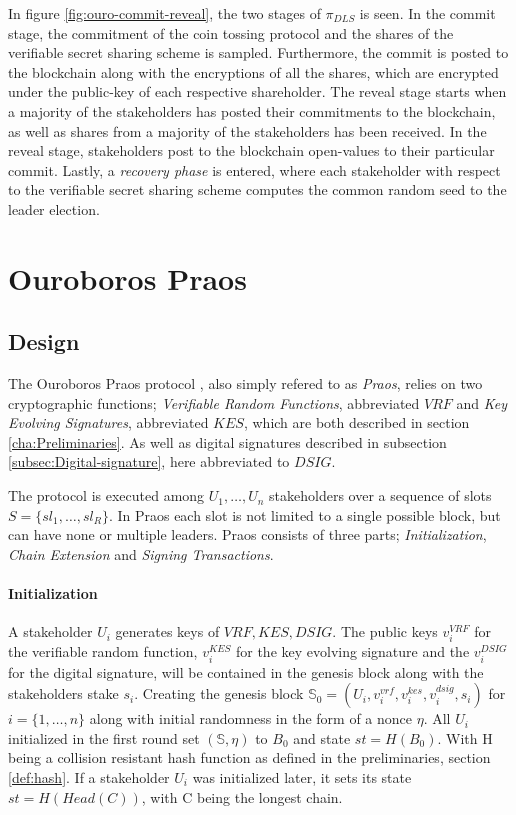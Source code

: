 In figure \ref{fig:ouro-commit-reveal}, the two stages of $\pi_{DLS}$ is seen. In the commit stage, the commitment of the coin tossing protocol and the shares of the verifiable secret sharing scheme is sampled. Furthermore, the commit is posted to the blockchain along with the encryptions of all the shares, which are encrypted under the public-key of each respective shareholder. The reveal stage starts when a majority of the stakeholders has posted their commitments to the blockchain, as well as shares from a majority of the stakeholders has been received. In the reveal stage, stakeholders post to the blockchain open-values to their particular commit. Lastly, a \emph{recovery phase} is entered, where each stakeholder with respect to the verifiable secret sharing scheme computes the common random seed to the leader election. 


\section{Ouroboros Praos}

\subsection{Design}

The Ouroboros Praos protocol \cite{ouroboros-praos}, also simply refered to as \emph{Praos}, relies on two cryptographic functions; \emph{Verifiable Random Functions}, abbreviated $VRF$ and \emph{Key Evolving Signatures}, abbreviated $KES$, which are both described in section \ref{cha:Preliminaries}. As well as digital signatures described in subsection \ref{subsec:Digital-signature}, here abbreviated to $DSIG$. 

The protocol is executed among $U_1,\dots, U_n$ stakeholders over a sequence of slots $S = \{sl_1, \dots, sl_R\}$. In Praos each slot is not limited to a single possible block, but can have none or multiple leaders. Praos consists of three parts; \emph{Initialization}, \emph{Chain Extension} and \emph{Signing Transactions}.

\paragraph{Initialization} A stakeholder $U_i$ generates keys of $VRF, KES, DSIG$. The public keys $v^{VRF}_i$ for the verifiable random function, $v^{KES}_i$ for the key evolving signature and the $v^{DSIG}_i$ for the digital signature, will be contained in the genesis block along with the stakeholders stake $s_i$. Creating the genesis block $\mathbb{S}_0 = (U_i, v_i^{vrf}, v_i^{kes}, v_i^{dsig}, s_i)$ for $i = \{1, \dots, n\}$ along with initial randomness in the form of a nonce $\eta$. All $U_i$ initialized in the first round set $(\mathbb{S},\eta)$ to $B_0$ and state $st = H(B_0)$. With H being a collision resistant hash function as defined in the preliminaries, section \ref{def:hash}. If a stakeholder $U_i$ was initialized later, it sets its state $st = H(Head(C))$, with C being the longest chain.

